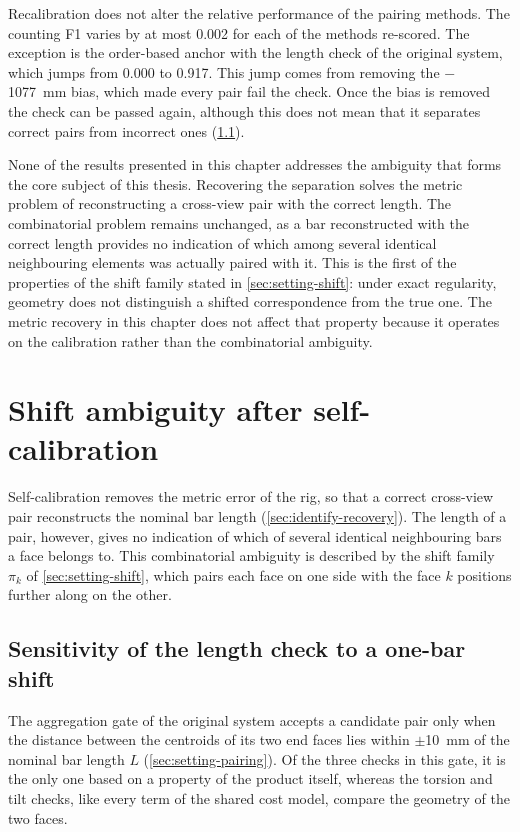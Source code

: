 \documentclass[a4paper, 12pt, twoside]{book}
\begin{document}
Recalibration does not alter the relative performance of the pairing methods. The counting F1 varies by at most 0.002 for each of the methods re-scored. The exception is the order-based anchor with the length check of the original system, which jumps from 0.000 to 0.917. This jump comes from removing the $-$1077~mm bias, which made every pair fail the check. Once the bias is removed the check can be passed again, although this does not mean that it separates correct pairs from incorrect ones (\cref{sec:ambiguity-length}).

None of the results presented in this chapter addresses the ambiguity that forms the core subject of this thesis. Recovering the separation solves the metric problem of reconstructing a cross-view pair with the correct length. The combinatorial problem remains unchanged, as a bar reconstructed with the correct length provides no indication of which among several identical neighbouring elements was actually paired with it. This is the first of the properties of the shift family stated in \cref{sec:setting-shift}: under exact regularity, geometry does not distinguish a shifted correspondence from the true one. The metric recovery in this chapter does not affect that property because it operates on the calibration rather than the combinatorial ambiguity.

\chapter{Shift ambiguity after self-calibration}
\label{ch:ambiguity}

Self-calibration removes the metric error of the rig, so that a correct cross-view pair reconstructs the nominal bar length (\cref{sec:identify-recovery}). The length of a pair, however, gives no indication of which of several identical neighbouring bars a face belongs to. This combinatorial ambiguity is described by the shift family $\pi_k$ of \cref{sec:setting-shift}, which pairs each face on one side with the face $k$ positions further along on the other.

\section{Sensitivity of the length check to a one-bar shift}
\label{sec:ambiguity-length}

The aggregation gate of the original system accepts a candidate pair only when the distance between the centroids of its two end faces lies within $\pm$10~mm of the nominal bar length $L$ (\cref{sec:setting-pairing}). Of the three checks in this gate, it is the only one based on a property of the product itself, whereas the torsion and tilt checks, like every term of the shared cost model, compare the geometry of the two faces.
\end{document}

